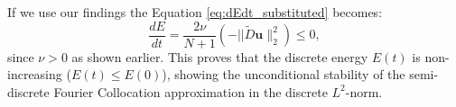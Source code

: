 If we use our findings the Equation \ref{eq:dEdt_substituted} becomes:
\begin{equation}
	\frac{dE}{dt} = \frac{2\nu}{N+1} (-||\tilde{D}\mathbf{u}\|_2^2) \leq 0,
	\label{eq:dEdt_final}
\end{equation}
since $\nu > 0$ as shown earlier.
This proves that the discrete energy $E(t)$ is non-increasing ($E(t) \le E(0)$), showing the unconditional stability of the semi-discrete Fourier Collocation approximation in the discrete $L^2$-norm.

%
